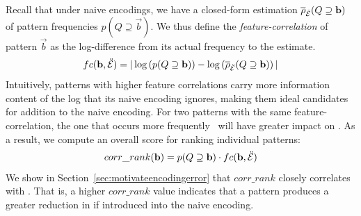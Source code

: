 Recall that under naive encodings, we have a closed-form estimation $\overline \rho_{\ddot{\mathcal E}}(Q \supseteq \mathbf{b})$ of pattern frequencies $p(Q\supseteq\vec b)$.
We thus define the \textit{feature-correlation} of pattern $\vec b$ as the log-difference from its actual frequency to the estimate.
$$fc(\mathbf{b}, \ddot{\mathcal E}) = |\log\left(
    p(Q \supseteq \mathbf{b})
\right) - \log\left(
  \overline \rho_{\ddot{\mathcal E}}(Q \supseteq \mathbf{b})
\right)|$$
Intuitively, patterns with higher feature correlations carry more information content of the log that its naive encoding ignores, making them ideal candidates for addition to the naive encoding.
For two patterns with the same feature-correlation, the one that occurs more frequently~\cite{DBLP:journals/datamine/HanCXY07} will have greater impact on \errorname. 
As a result, we compute an overall score for ranking individual patterns:  
$$corr\_rank(\mathbf{b})=p(Q \supseteq \mathbf{b}) \cdot fc(\mathbf{b}, \ddot{\mathcal E})$$
We show in Section~\ref{sec:motivateencodingerror} that $corr\_rank$ closely correlates with \errorname.
That is, a higher $corr\_rank$ value indicates that a pattern produces a greater reduction in \errorname if introduced into the naive encoding.

